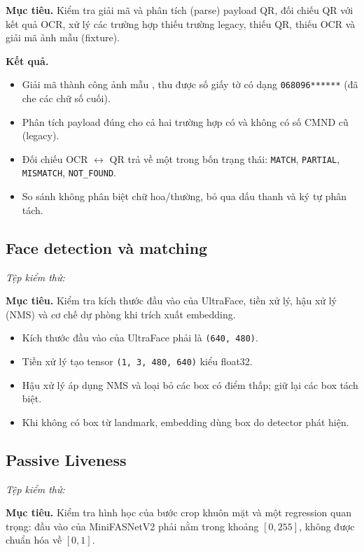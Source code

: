 \documentclass[12pt,a4paper]{article}
\begin{document}
\textbf{Mục tiêu.} Kiểm tra giải mã và phân tích (parse) payload QR, đối chiếu QR với kết quả OCR, xử lý các
trường hợp thiếu trường legacy, thiếu QR, thiếu OCR và giải mã ảnh mẫu (fixture).

\textbf{Kết quả.}
\begin{itemize}
  \item Giải mã thành công ảnh mẫu , thu được số giấy tờ có dạng
        \texttt{068096******} (đã che các chữ số cuối).
  \item Phân tích payload đúng cho cả hai trường hợp có và không có số CMND cũ (legacy).
  \item Đối chiếu OCR $\leftrightarrow$ QR trả về một trong bốn trạng thái: \texttt{MATCH}, \texttt{PARTIAL},
        \texttt{MISMATCH}, \texttt{NOT\_FOUND}.
  \item So sánh không phân biệt chữ hoa/thường, bỏ qua dấu thanh và ký tự phân tách.
\end{itemize}

\subsection{Face detection và matching}
\textit{Tệp kiểm thử:} 

\textbf{Mục tiêu.} Kiểm tra kích thước đầu vào của UltraFace, tiền xử lý, hậu xử lý (NMS) và cơ chế dự phòng
khi trích xuất embedding.

\begin{itemize}
  \item Kích thước đầu vào của UltraFace phải là \texttt{(640, 480)}.
  \item Tiền xử lý tạo tensor \texttt{(1, 3, 480, 640)} kiểu float32.
  \item Hậu xử lý áp dụng NMS và loại bỏ các box có điểm thấp; giữ lại các box tách biệt.
  \item Khi không có box từ landmark, embedding dùng box do detector phát hiện.
\end{itemize}

\subsection{Passive Liveness}
\textit{Tệp kiểm thử:} 

\textbf{Mục tiêu.} Kiểm tra hình học của bước crop khuôn mặt và một regression quan trọng: đầu vào của
MiniFASNetV2 phải nằm trong khoảng $[0, 255]$, không được chuẩn hóa về $[0, 1]$.
\end{document}
